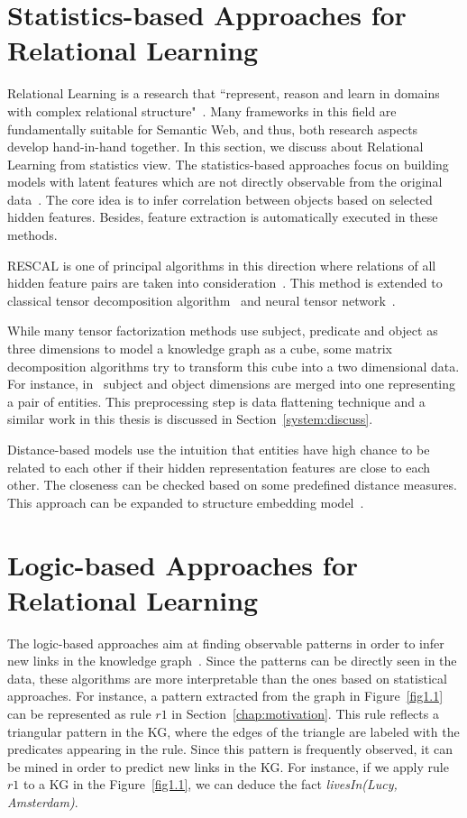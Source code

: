 \section{Statistics-based Approaches for Relational Learning}

Relational Learning is a research that ``represent, reason and learn in domains with complex relational structure"~\cite{ref43}. Many frameworks in this field are fundamentally suitable for Semantic Web, and thus, both research aspects develop hand-in-hand together. In this section, we discuss about Relational Learning from statistics view. The statistics-based approaches focus on building models with latent features which are not directly observable from the original data~\cite{ref1}. The core idea is to infer correlation between objects based on selected hidden features. Besides, feature extraction is automatically executed in these methods.

RESCAL is one of principal algorithms in this direction where relations of all hidden feature pairs are taken into consideration~\cite{ref2, ref3}. This method is extended to classical tensor decomposition algorithm~\cite{ref4} and neural tensor network~\cite{ref5}.

While many tensor factorization methods use subject, predicate and object as three dimensions to model a knowledge graph as a cube, some matrix decomposition algorithms try to transform this cube into a two dimensional data. For instance, in~\cite{ref6, ref7} subject and object dimensions are merged into one representing a pair of entities. This preprocessing step is data flattening technique and a similar work in this thesis is discussed in Section~\ref{system:discuss}.

Distance-based models use the intuition that entities have high chance to be related to each other if their hidden representation features are close to each other. The closeness can be checked based on some predefined distance measures. This approach can be expanded to structure embedding model~\cite{ref8}.

\section{Logic-based Approaches for Relational Learning}

The logic-based approaches aim at finding observable patterns in order to infer new links in the knowledge graph~\cite{ref1}. Since the patterns can be directly seen in the data, these algorithms are more interpretable than the ones based on statistical approaches. For instance, a pattern extracted from the graph in Figure~\ref{fig1.1} can be represented as rule $r1$ in Section~\ref{chap:motivation}. This rule reflects a triangular pattern in the KG, where the edges of the triangle are labeled with the predicates appearing in the rule. Since this pattern is frequently observed, it can be mined in order to predict new links in the KG. For instance, if we apply rule $r1$ to a KG in the Figure~\ref{fig1.1}, we can deduce the fact \textit{livesIn(Lucy, Amsterdam)}.

